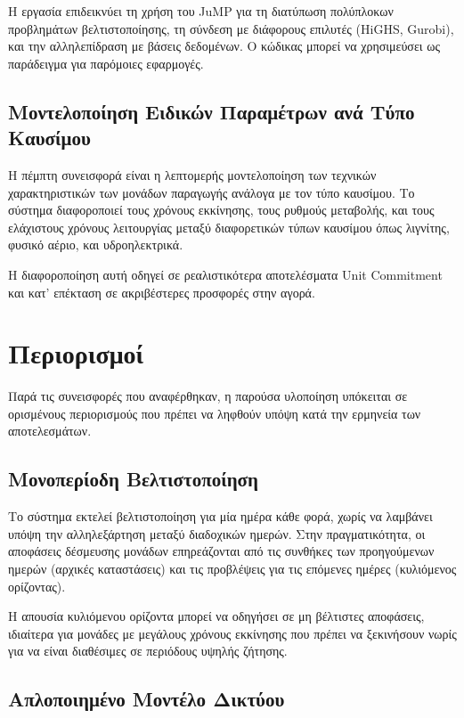 Η εργασία επιδεικνύει τη χρήση του JuMP για τη διατύπωση πολύπλοκων προβλημάτων βελτιστοποίησης, τη σύνδεση με διάφορους επιλυτές (HiGHS, Gurobi), και την αλληλεπίδραση με βάσεις δεδομένων. Ο κώδικας μπορεί να χρησιμεύσει ως παράδειγμα για παρόμοιες εφαρμογές.

\subsection{Μοντελοποίηση Ειδικών Παραμέτρων ανά Τύπο Καυσίμου}
\label{subsec:fuel-type-contribution}

Η πέμπτη συνεισφορά είναι η λεπτομερής μοντελοποίηση των τεχνικών χαρακτηριστικών των μονάδων παραγωγής ανάλογα με τον τύπο καυσίμου. Το σύστημα διαφοροποιεί τους χρόνους εκκίνησης, τους ρυθμούς μεταβολής, και τους ελάχιστους χρόνους λειτουργίας μεταξύ διαφορετικών τύπων καυσίμου όπως λιγνίτης, φυσικό αέριο, και υδροηλεκτρικά.

Η διαφοροποίηση αυτή οδηγεί σε ρεαλιστικότερα αποτελέσματα Unit Commitment και κατ' επέκταση σε ακριβέστερες προσφορές στην αγορά.


\section{Περιορισμοί}
\label{sec:limitations}

Παρά τις συνεισφορές που αναφέρθηκαν, η παρούσα υλοποίηση υπόκειται σε ορισμένους περιορισμούς που πρέπει να ληφθούν υπόψη κατά την ερμηνεία των αποτελεσμάτων.

\subsection{Μονοπερίοδη Βελτιστοποίηση}
\label{subsec:single-period-limitation}

Το σύστημα εκτελεί βελτιστοποίηση για μία ημέρα κάθε φορά, χωρίς να λαμβάνει υπόψη την αλληλεξάρτηση μεταξύ διαδοχικών ημερών. Στην πραγματικότητα, οι αποφάσεις δέσμευσης μονάδων επηρεάζονται από τις συνθήκες των προηγούμενων ημερών (αρχικές καταστάσεις) και τις προβλέψεις για τις επόμενες ημέρες (κυλιόμενος ορίζοντας).

Η απουσία κυλιόμενου ορίζοντα μπορεί να οδηγήσει σε μη βέλτιστες αποφάσεις, ιδιαίτερα για μονάδες με μεγάλους χρόνους εκκίνησης που πρέπει να ξεκινήσουν νωρίς για να είναι διαθέσιμες σε περιόδους υψηλής ζήτησης.

\subsection{Απλοποιημένο Μοντέλο Δικτύου}
\label{subsec:network-limitation}

